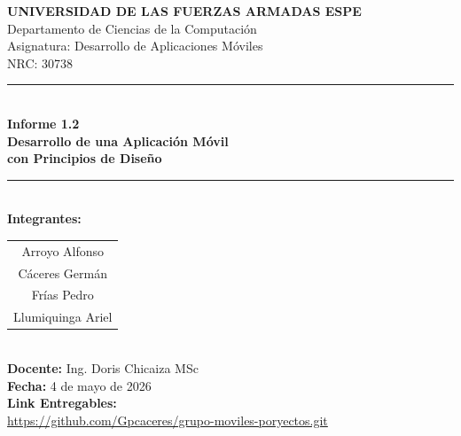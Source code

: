 \documentclass[12pt,a4paper]{article}
\begin{document}

\thispagestyle{portada}
\singlespacing
\setlength{\parskip}{0pt}
\vspace*{1.2cm}
\begin{center}
  {\Large\bfseries\color{espeblue}
    UNIVERSIDAD DE LAS FUERZAS ARMADAS ESPE\\[0.3cm]}
  {\large\color{espeblue}
    Departamento de Ciencias de la Computación\\[0.2cm]
    Asignatura: Desarrollo de Aplicaciones Móviles\\[0.2cm]
    NRC: 30738\\[0.6cm]}
  \textcolor{espeblue}{\rule{\linewidth}{1.5pt}}\\[0.4cm]
  {\LARGE\bfseries\color{espeblue}
    Informe 1.2\\[0.25cm]
    Desarrollo de una Aplicación Móvil\\[0.15cm]
    con Principios de Diseño\\[0.35cm]}
  \textcolor{espeblue}{\rule{\linewidth}{1.5pt}}\\[1.0cm]
  {\large\bfseries Integrantes:}\\[0.4cm]
  \begin{tabular}{c}
    Arroyo Alfonso\\[0.15cm]
    Cáceres Germán\\[0.15cm]
    Frías Pedro\\[0.15cm]
    Llumiquinga Ariel\\
  \end{tabular}\\[1.5cm]
  {\large\textbf{Docente:} Ing. Doris Chicaiza MSc}\\[0.35cm]
  {\large\textbf{Fecha:} 4 de mayo de 2026}\\[0.35cm]
  
  {\large\textbf{Link Entregables:}}\\[0.35cm]
  {\large\url{https://github.com/Gpcaceres/grupo-moviles-poryectos.git}}\\[0.35cm]

\end{center}

\newpage
{}

\tableofcontents
\end{document}

